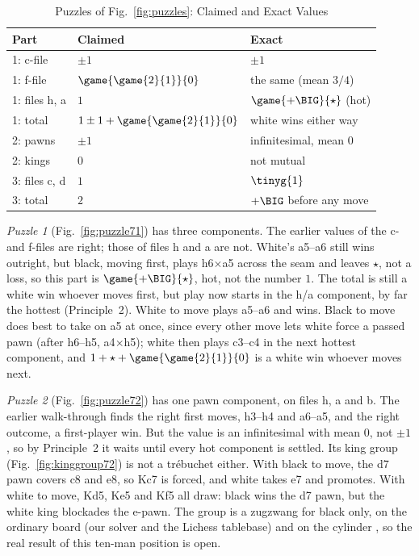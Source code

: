 \begin{table}[!htbp]
\centering
\caption{Puzzles of Fig.~\ref{fig:puzzles}: Claimed and Exact Values }
\label{tab:puzzles}
\begin{tabular}{@{}lll@{}}
\toprule
Part & Claimed~\cite{Study2025} & Exact \\
\midrule
1: c-file & $\pm1$ & $\pm1$ \\
1: f-file & $\game{\game{2}{1}}{0}$ & the same (mean $3/4$) \\
1: files h, a & $1$ & $\game{+\BIG}{\star}$ (hot) \\
1: total & $1\pm1+\game{\game{2}{1}}{0}$ & white wins either way \\
2: pawns & $\pm1$ & infinitesimal, mean $0$ \\
2: kings & $0$ & not mutual \\
3: files c, d & $1$ & $\tinyg{1}$ \\
3: total & $2$ & $+\BIG$ before any move \\
\bottomrule
\end{tabular}
\end{table}

\emph{Puzzle 1} (Fig.~\ref{fig:puzzle71}) has three components. The earlier values of the c- and f-files are right;
those of files h and a are not. White's a5--a6 still wins
outright, but black, moving first, plays h6$\times$a5 across the seam and leaves $\star$, not a loss, so this
part is $\game{+\BIG}{\star}$, hot, not the number $1$. The total is still a white win whoever moves first, but
play now starts in the h/a component, by far the hottest (Principle~2). White to move plays a5--a6 and wins.
Black to move does best to take on a5 at once, since every other move lets white force a passed pawn (after
h6--h5, a4$\times$h5); white then plays c3--c4 in the next hottest component, and
$1+\star+\game{\game{2}{1}}{0}$ is a white win whoever moves next.

\emph{Puzzle 2} (Fig.~\ref{fig:puzzle72}) has one pawn component, on files h, a and b. The earlier walk-through
finds the right first moves, h3--h4 and a6--a5, and the right outcome, a first-player win. But the value is an
infinitesimal with mean $0$, not $\pm1$, so by Principle~2 it waits until every hot component is settled.
Its king group (Fig.~\ref{fig:kinggroup72}) is not a tr\'ebuchet either. With black to move, the d7 pawn covers
c8 and e8, so Kc7 is forced, and white takes e7 and promotes. With white to move, Kd5, Ke5 and Kf5 all draw:
black wins the d7 pawn, but the white king blockades the e-pawn. The group is a zugzwang for black only, on the
ordinary board  (our solver and the Lichess tablebase) and on the cylinder , so the real result
of this ten-man position is open.

